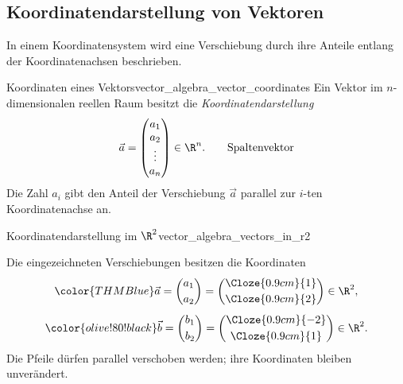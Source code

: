 \subsection{Koordinatendarstellung von Vektoren}
\label{subsec:vector_algebra_coordinate_representation}

In einem Koordinatensystem wird eine Verschiebung durch ihre Anteile entlang
der Koordinatenachsen beschrieben.

\begin{DefinitionBox}{Koordinaten eines Vektors}{vector_algebra_vector_coordinates}
  Ein Vektor im $n$-dimensionalen reellen Raum besitzt die
  \emph{Koordinatendarstellung} 
  \[
    \vec a=
    \begin{pmatrix}
      a_1\\a_2\\\vdots\\a_n
    \end{pmatrix}
    \in\R^n.
    \qquad \text{Spaltenvektor}
  \]
  Die Zahl $a_i$ gibt den Anteil der Verschiebung $\vec a$ parallel zur
  $i$-ten Koordinatenachse an.
\end{DefinitionBox}

\begin{ExampleBox}{Koordinatendarstellung im $\R^2$}{vector_algebra_vectors_in_r2}
  \noindent
  \begin{minipage}[c]{0.40\linewidth}
    Die eingezeichneten Verschiebungen besitzen die Koordinaten
    \[
      {\color{THMBlue}
        \vec a =
        \begin{pmatrix} a_1 \\[0.25em] a_2 \end{pmatrix} =
        \begin{pmatrix}
          \Cloze{0.9cm}{1}\\[0.25em]
          \Cloze{0.9cm}{2}
        \end{pmatrix}
        }
      \in\R^2,
    \]
    \[
      {\color{olive!80!black}
        \vec b =
        \begin{pmatrix} b_1 \\[0.25em] b_2 \end{pmatrix} =
        \begin{pmatrix}
          \Cloze{0.9cm}{-2}\\[0.25em]
          \Cloze{0.9cm}{1}
        \end{pmatrix}}
      \in\R^2.
    \]
    Die Pfeile dürfen parallel verschoben werden; ihre Koordinaten bleiben
    unverändert.
  \end{minipage}\hfill
  \begin{minipage}[c]{0.56\linewidth}
    \centering
  \end{minipage}
\end{ExampleBox}

